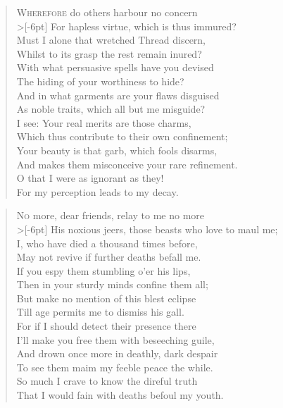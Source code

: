 \documentclass[a5paper, 12pt, oneside]{memoir}
\begin{document}
\PoemTitle{}
\begin{verse}
    \lettrine{W}{herefore} do others harbour no concern \\>[-6pt]
    For hapless virtue, which is thus immured? \\
    Must I alone that wretched Thread discern, \\
    Whilst to its grasp the rest remain inured? \\
    With what persuasive spells have you devised \\
    The hiding of your worthiness to hide? \\
    And in what garments are your flaws disguised \\
    As noble traits, which all but me misguide? \\
    I see: Your real merits are those charms, \\
    Which thus contribute to their own confinement; \\
    Your beauty is that garb, which fools disarms, \\
    And makes them misconceive your rare refinement. \\
    \vin O that I were as ignorant as they! \\
    \vin For my perception leads to my decay.
\end{verse}

\PoemTitle{}
\begin{verse}
    \lettrine{N}{o} more, dear friends, relay to me no more \\>[-6pt]
    His noxious jeers, those beasts who love to maul me; \\
    I, who have died a thousand times before, \\
    May not revive if further deaths befall me. \\ 
    If you espy them stumbling o'er his lips, \\
    Then in your sturdy minds confine them all; \\
    But make no mention of this blest eclipse \\
    Till age permits me to dismiss his gall. \\
    For if I should detect their presence there \\
    I'll make you free them with beseeching guile, \\
    And drown once more in deathly, dark despair \\
    To see them maim my feeble peace the while. \\
    \vin So much I crave to know the direful truth \\
    \vin That I would fain with deaths befoul my youth.
\end{verse}
\end{document}
